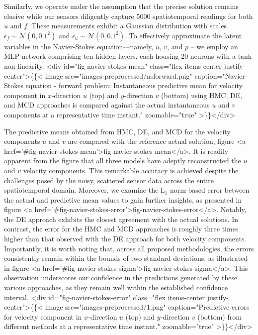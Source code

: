 \documentclass{article}
\begin{document}
Similarly, we operate under the assumption that the precise solution remains elusive while our sensors diligently capture 5000 spatiotemporal readings for both $u$ and $f$.
These measurements exhibit a Gaussian distribution with scales $\epsilon_f \sim \mathcal{N}(0, 0.1^2)$ and $\epsilon_u \sim \mathcal{N}(0, 0.1^2)$. 
To effectively approximate the latent variables in the Navier-Stokes equation—namely, $u$, $v$, and $p$ -- we employ an MLP network comprising ten hidden layers, each housing 20 neurons with a tanh non-linearity.
<div id="fig-navier-stokes-mean" class="flex items-center justify-center">\{\{< image src="images-preprocessed/nsforward.png" caption="Navier-Stokes equation - forward problem: Instantaneous predictive mean for velocity component in $x$-direction $u$ (top) and $y$-direction $v$ (bottom) using HMC, DE, and MCD approaches is compared against the actual instantaneous $u$ and $v$ components at a representative time instant." zoomable="true" >\}\}</div>



The predictive means obtained from HMC, DE, and MCD for the velocity components $u$ and $v$ are compared with the reference actual solution, figure <a href='#fig-navier-stokes-mean'>fig-navier-stokes-mean</a>. 
It is readily apparent from the figure that all three models have adeptly reconstructed the $u$ and $v$ velocity components. 
This remarkable accuracy is achieved despite the challenges posed by the noisy, scattered sensor data across the entire spatiotemporal domain.
Moreover, we examine the $\mathrm{L}_1$ norm-based error between the actual and predictive mean values to gain further insights, as presented in figure <a href='#fig-navier-stokes-error'>fig-navier-stokes-error</a>.
Notably, the DE approach exhibits the closest agreement with the actual solutions. 
In contrast, the error for the HMC and MCD approaches is roughly three times higher than that observed with the DE approach for both velocity components.
Importantly, it is worth noting that, across all proposed methodologies, the errors consistently remain within the bounds of two standard deviations, as illustrated in figure <a href='#fig-navier-stokes-sigma'>fig-navier-stokes-sigma</a>.
This observation underscores our confidence in the predictions generated by these various approaches, as they remain well within the established confidence interval.
<div id="fig-navier-stokes-error" class="flex items-center justify-center">\{\{< image src="images-preprocessed/1.png" caption="Predictive errors for velocity component in $x$-direction $u$ (top) and $y$-direction $v$ (bottom) from different methods at a representative time instant." zoomable="true" >\}\}</div>
\end{document}
